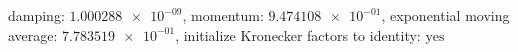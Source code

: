 damping: $\num[scientific-notation=true]{1.000288e-09}$, momentum: $\num[scientific-notation=true]{9.474108e-01}$, exponential moving average: $\num[scientific-notation=true]{7.783519e-01}$, initialize Kronecker factors to identity: $\text{yes}$